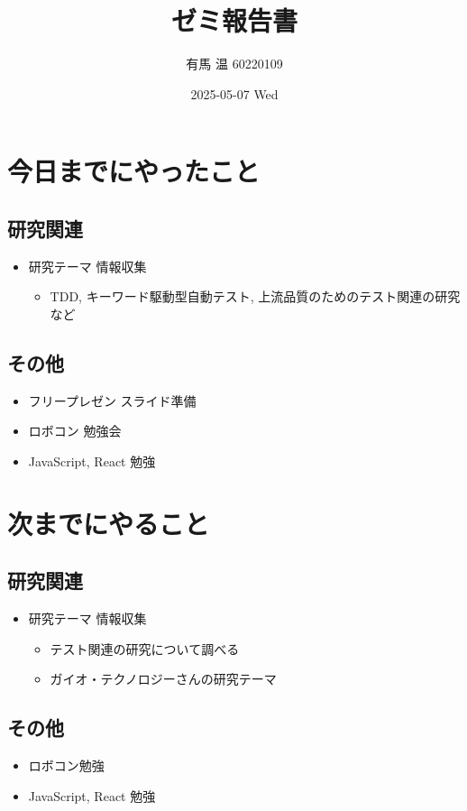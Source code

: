 \documentclass[uplatex, onecolumn, 10pt]{jsarticle}
\begin{document}
\title{\vspace{-40mm}\bf{\LARGE{ゼミ報告書}}}
\author{\vspace{-40mm}有馬 温 60220109}
\date{2025-05-07 Wed}
\maketitle


\section{今日までにやったこと}

\subsection*{研究関連} 
\begin{itemize}
	\item 研究テーマ 情報収集
		\begin{itemize}
			\item TDD, キーワード駆動型自動テスト, 上流品質のためのテスト関連の研究など
		\end{itemize}
\end{itemize}

\subsection*{その他}
\begin{itemize}
	\item フリープレゼン スライド準備
	\item ロボコン 勉強会
	\item JavaScript, React 勉強
\end{itemize}


\section{次までにやること}

\subsection*{研究関連}
\begin{itemize}
	\item 研究テーマ 情報収集
		\begin{itemize}
			\item テスト関連の研究について調べる
		\end{itemize}
		\begin{itemize}
			\item ガイオ・テクノロジーさんの研究テーマ
		\end{itemize}
\end{itemize}

\subsection*{その他}
\begin{itemize}
    \item ロボコン勉強
    \item JavaScript, React 勉強
\end{itemize}
\end{document}
